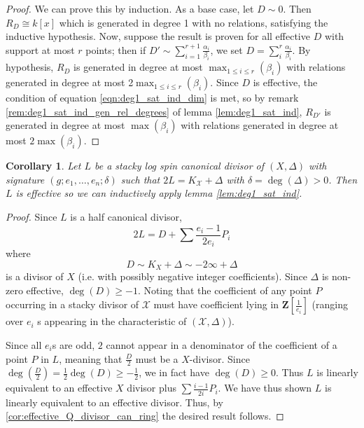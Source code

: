 \documentclass{amsart}
\theoremstyle{plain}
\newtheorem{cor}[thm]{Corollary}
\theoremstyle{definition}
\theoremstyle{remark}
\numberwithin{equation}{section}
\newcommand \sx{\mathscr X}
\newcommand \subhalf[1]{\frac{{#1} - 1}{2{#1}}}
\newcommand \halfcan{L}
\begin{document}
\begin{proof}
We can prove this by induction.  As a base case, let $D\sim 0$.  Then $R_D\cong k[x]$ which is generated in degree 1 with no relations, satisfying the inductive hypothesis.
Now, suppose the result is proven for all effective $D$ with support at most $r$ points; then if $D'\sim \sum_{i=1}^{r+1} \frac{\alpha_i}{\beta_i}$, we set $D=\sum_i^{r} \frac{\alpha_i}{\beta_i}$.  By hypothesis, $R_D$ is generated in degree at most $\max_{1\le i\le r}(\beta_i)$ with relations generated in degree at most 2$\max_{1\le i\le r}(\beta_i)$.  Since $D$ is effective, the condition of equation \ref{eqn:deg1_sat_ind_dim} is met, so by remark \ref{rem:deg1_sat_ind_gen_rel_degrees} of lemma \ref{lem:deg1_sat_ind}, $R_{D'}$ is generated in degree at most $\max(\beta_i)$ with relations generated in degree at most $2\max(\beta_i)$.
\end{proof}


\begin{cor}\label{cor:genus_0_positive_delta}
Let $\halfcan$ be a stacky log spin canonical divisor of $(X,\Delta)$ with signature $(g;e_1,\ldots, e_n;\delta)$ such that $2\halfcan=K_\sx+\Delta$ with $\delta=\deg(\Delta)>0$.  Then $\halfcan$ is effective so we can inductively apply lemma \ref{lem:deg1_sat_ind}.
\end{cor}
\begin{proof}
Since $\halfcan$ is a half canonical divisor, 
\[
	2\halfcan=D+\sum \subhalf{e_i}P_i
\] 
where 
\[
	D\sim K_X+\Delta\sim -2\infty+ \Delta
\] is a divisor of $X$ (i.e. with 
possibly negative integer coefficients).  Since $\Delta$ is non-
zero effective, $\deg(D)\ge -1$.   Noting that the coefficient of 
any point $P$ occurring in a stacky divisor of $\sx$ must have 
coefficient lying in $\mathbf{Z}[\frac{1}{e_i}]$ (ranging over $e_i$
s appearing in the characteristic of $(\sx,\Delta)$).
 
Since all $e_i$s are odd, $2$ cannot appear in a denominator of the 
coefficient of a point $P$ in $\halfcan$, meaning that $\frac{D}{2}$
 must be a $X$-divisor.  Since $\deg(\frac{D}{2})=\frac{1}{2}\deg(D)
\ge -\frac{1}{2}$, we in fact have $\deg(D)\ge 0$.  Thus $\halfcan$ 
is linearly equivalent to an effective $X$ divisor plus $\sum 
\subhalf{i}P_i$.  We have thus shown $\halfcan$ is linearly equivalent to an effective divisor.  Thus, by \ref{cor:effective_Q_divisor_can_ring} the desired result follows.
\end{proof}
\end{document}

